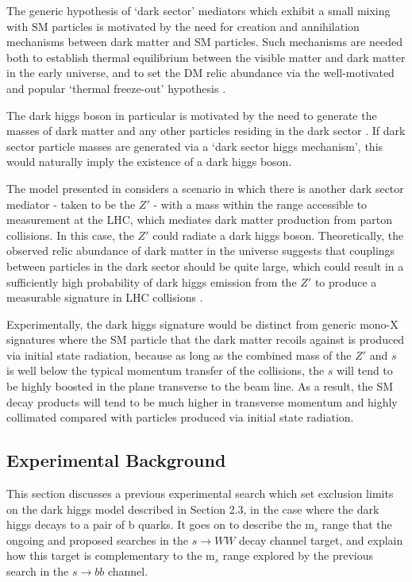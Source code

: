 \documentclass[12pt]{article}
\begin{document}
The generic hypothesis of `dark sector' mediators which exhibit a small mixing with SM particles is motivated by the need for creation and annihilation mechanisms between dark matter and SM particles. Such mechanisms are needed both to establish thermal equilibrium between the visible matter and dark matter in the early universe, and to set the DM relic abundance via the well-motivated and popular `thermal freeze-out' hypothesis \cite{particle_dm}.

The dark higgs boson in particular is motivated by the need to generate the masses of dark matter and any other particles residing in the dark sector \cite{dark_higgs}. If dark sector particle masses are generated via a `dark sector higgs mechanism', this would naturally imply the existence of a dark higgs boson. 

The model presented in \cite{dark_higgs} considers a scenario in which there is another dark sector mediator - taken to be the $Z'$ - with a mass within the range accessible to measurement at the LHC, which mediates dark matter production from parton collisions. In this case, the $Z'$ could radiate a dark higgs boson. Theoretically, the observed relic abundance of dark matter in the universe suggests that couplings between particles in the dark sector should be quite large, which could result in a sufficiently high probability of dark higgs emission from the $Z'$ to produce a measurable signature in LHC collisions \cite{dark_higgs}. 

Experimentally, the dark higgs signature would be distinct from generic mono-X signatures where the SM particle that the dark matter recoils against is produced via initial state radiation, because as long as the combined mass of the $Z'$ and $s$ is well below the typical momentum transfer of the collisions, the $s$ will tend to be highly boosted in the plane transverse to the beam line. As a result, the SM decay products will tend to be much higher in transverse momentum and highly collimated compared with particles produced via initial state radiation.  

\subsection{Experimental Background}

This section discusses a previous experimental search which set exclusion limits on the dark higgs model described in Section 2.3, in the case where the dark higgs decays to a pair of b quarks. It goes on to describe the m$_s$ range that the ongoing and proposed searches in the $s \rightarrow WW$ decay channel target, and explain how this target is complementary to the m$_s$ range explored by the previous search in the $s \rightarrow bb$ channel. 
\end{document}
